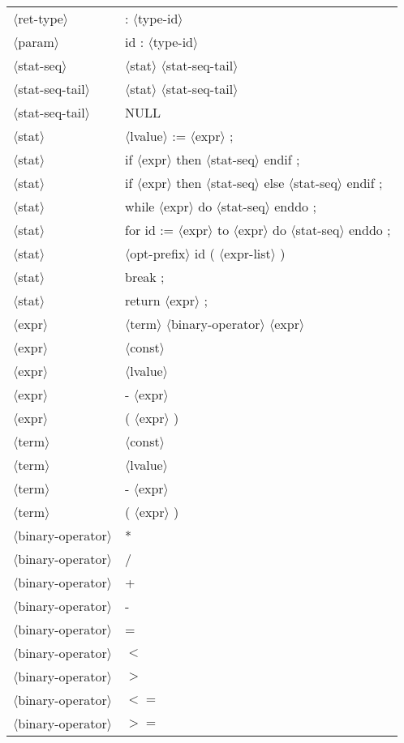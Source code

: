 \documentclass[11pt, fleqn]{article}
\newcommand{\atag}[1]{$\langle$#1$\rangle$}
\begin{document}
\begin{longtable}{l|l}
\atag{ret-type}					&	: \atag{type-id}		\\
\atag{param}						&	id : \atag{type-id}		\\
\atag{stat-seq}					&	\atag{stat} \atag{stat-seq-tail}		\\
\atag{stat-seq-tail}				&	\atag{stat} \atag{stat-seq-tail}		\\
\atag{stat-seq-tail}				&	NULL		\\
\atag{stat}						&	\atag{lvalue} := \atag{expr}	;	\\
\atag{stat}						&	if \atag{expr} then \atag{stat-seq} endif ;		\\
\atag{stat}						&	if \atag{expr} then \atag{stat-seq} else \atag{stat-seq} endif ;		\\
\atag{stat}						&	while \atag{expr} do \atag{stat-seq} enddo ;		\\
\atag{stat}						&	for id := \atag{expr} to \atag{expr} do \atag{stat-seq} enddo ;		\\
\atag{stat}						&	\atag{opt-prefix} id ( \atag{expr-list} ) \\
\atag{stat}						&	break ;		\\
\atag{stat}						&	return \atag{expr} ;		\\
\atag{expr}						&	\atag{term} \atag{binary-operator} \atag{expr}		\\
\atag{expr}						&	\atag{const}		\\
\atag{expr}						&	\atag{lvalue}		\\
\atag{expr}						&	- \atag{expr}		\\
\atag{expr}						&	( \atag{expr} )		\\
\atag{term}						&	\atag{const}		\\
\atag{term}						&	\atag{lvalue}		\\
\atag{term}						&	- \atag{expr}		\\
\atag{term}						&	( \atag{expr} )		\\
\atag{binary-operator}			&	*	\\
\atag{binary-operator}			&	/	\\
\atag{binary-operator}			&	+	\\
\atag{binary-operator}			&	-	\\
\atag{binary-operator}			&	=	\\
\atag{binary-operator}			&	$<$	\\
\atag{binary-operator}			&	$>$	\\
\atag{binary-operator}			&	$<=$	\\
\atag{binary-operator}			&	$>=$	\\

\end{longtable}
\end{document}
